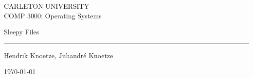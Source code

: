 \documentclass[12pt,letterpaper]{article}
\begin{document}
\renewcommand\headrule{}

\pagestyle{fancy}
\fancyhf{}
\rfoot{\thepage/\pageref{LastPage}}

\thispagestyle{empty}


\begin{center}
    CARLETON UNIVERSITY\\
	\vspace{0.5em}
	COMP 3000: Operating Systems
\end{center}

\vfill

\begin{center}
	{\Huge Sleepy Files}
	\vspace{0.5em}\rule{\textwidth}{0.5pt}
	Hendrik Knoetze, Juhandr\'e Knoetze	
\end{center}

\vfill

\begin{center}
	\today
\end{center}

\newpage{}

\tableofcontents{}



\newpage{}





\newpage{}

\newpage{}

\end{document}

